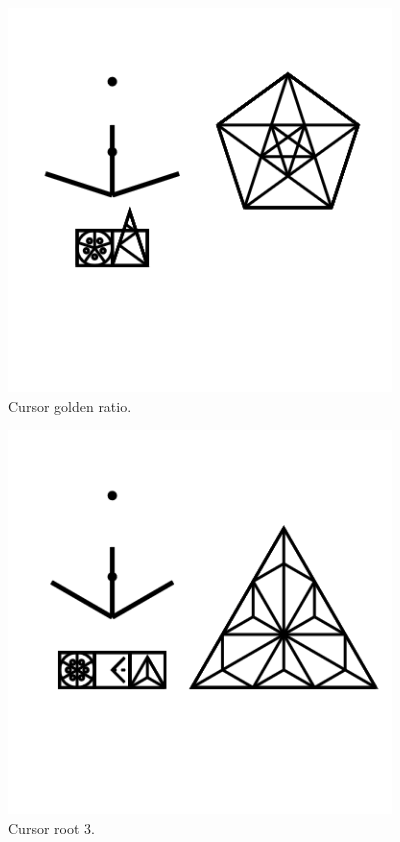 \begin{figure}
	\centering
	\includegraphics[width=4in]{figures/web2d/cursorgolden.png}
	\caption[cursorgolden]
	{Cursor golden ratio.}
\end{figure}
\begin{figure}
	\centering
	\includegraphics[width=4in]{figures/web2d/cursorroot3.png}
	\caption[cursorroot3]
	{Cursor root 3.}
\end{figure}
